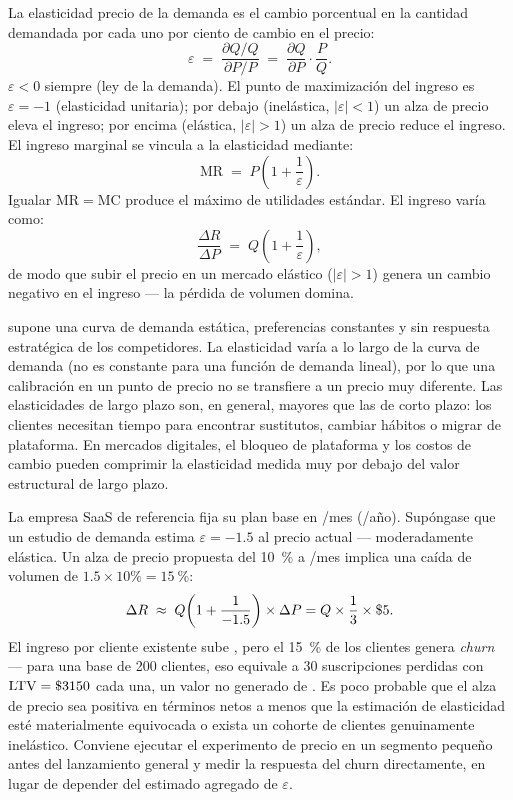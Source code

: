 La elasticidad precio de la demanda es el cambio porcentual en la cantidad demandada por cada uno
por ciento de cambio en el precio:
\begin{equation}\label{eq:elasticity}
  \varepsilon \;=\; \frac{\partial Q/Q}{\partial P/P}
              \;=\; \frac{\partial Q}{\partial P}\cdot\frac{P}{Q}.
\end{equation}
\(\varepsilon<0\) siempre (ley de la demanda). El punto de maximización del ingreso es \(\varepsilon=-1\)
(elasticidad unitaria); por debajo (inelástica, \(|\varepsilon|<1\)) un alza de precio eleva el ingreso;
por encima (elástica, \(|\varepsilon|>1\)) un alza de precio reduce el ingreso. El ingreso marginal se
vincula a la elasticidad mediante:
\[
  \mathrm{MR} \;=\; P\!\left(1+\frac{1}{\varepsilon}\right).
\]
Igualar \(\mathrm{MR}=\mathrm{MC}\) produce el máximo de utilidades estándar. El ingreso varía como:
\[
  \frac{\Delta R}{\Delta P} \;=\; Q\!\left(1 + \frac{1}{\varepsilon}\right),
\]
de modo que subir el precio en un mercado elástico (\(|\varepsilon|>1\)) genera un cambio negativo en el
ingreso --- la pérdida de volumen domina.

 supone una curva de demanda estática, preferencias constantes y sin respuesta
estratégica de los competidores. La elasticidad varía a lo largo de la curva de demanda (no es
constante para una función de demanda lineal), por lo que una calibración en un punto de precio no
se transfiere a un precio muy diferente. Las elasticidades de largo plazo son, en general, mayores
que las de corto plazo: los clientes necesitan tiempo para encontrar sustitutos, cambiar hábitos
o migrar de plataforma. En mercados digitales, el bloqueo de plataforma y los costos de cambio
pueden comprimir la elasticidad medida muy por debajo del valor estructural de largo plazo.

\begin{example}
La empresa SaaS de referencia fija su plan base en /mes (/año).
Supóngase que un estudio de demanda estima \(\varepsilon=-1.5\) al precio actual --- moderadamente elástica.
Un alza de precio propuesta del \qty{10}{\percent} a /mes implica una caída de volumen de
\(1.5\times10\%=\qty{15}{\percent}\):
\[
  \Delta R \;\approx\; Q\!\left(1+\frac{1}{-1.5}\right)\times\Delta P
           = Q\times\frac{1}{3}\times\$\num{5}.
\]
El ingreso por cliente existente sube , pero el \qty{15}{\percent} de los clientes genera
\emph{churn} --- para una base de \num{200} clientes, eso equivale a \num{30} suscripciones perdidas con
\(\mathrm{LTV}=\$\num{3150}\) cada una, un valor no generado de . Es poco probable que el
alza de precio sea positiva en términos netos a menos que la estimación de elasticidad esté materialmente
equivocada o exista un cohorte de clientes genuinamente inelástico. Conviene ejecutar el experimento
de precio en un segmento pequeño antes del lanzamiento general y medir la respuesta del churn
directamente, en lugar de depender del estimado agregado de \(\varepsilon\).
\end{example}

